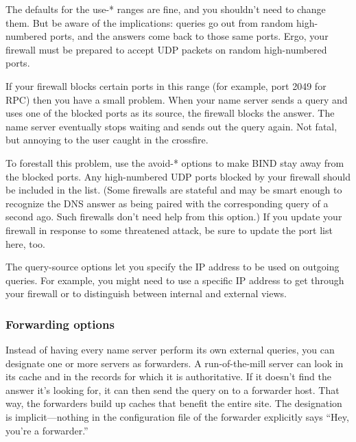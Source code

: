 The defaults for the {use-*} ranges are fine, and you shouldn't need to
change them. But be aware of the implications: queries go out from
random high-numbered ports, and the answers come back to those same
ports. Ergo, your firewall must be prepared to accept UDP packets on
random high-numbered ports.

If your firewall blocks certain ports in this range (for example, port
2049 for RPC) then you have a small problem. When your name server sends
a query and uses one of the blocked ports as its source, the firewall
blocks the answer. The name server eventually stops waiting and sends
out the query again. Not fatal, but annoying to the user caught in the
crossfire.

To forestall this problem, use the {avoid-*} options to make BIND stay
away from the blocked ports. Any high-numbered UDP ports blocked by your
firewall should be included in the list. (Some firewalls are stateful
and may be smart enough to recognize the DNS answer as being paired with
the corresponding query of a second ago. Such firewalls don't need help
from this option.) If you update your firewall in response to some
threatened attack, be sure to update the port list here, too.

The {query-source} options let you specify the IP address to be used on
outgoing queries. For example, you might need to use a specific IP
address to get through your firewall or to distinguish between internal
and external views.

\subsubsection[Forwarding options]{\texorpdfstring{Forwarding
options\protect\hypertarget{part0024_split_037.htmlux5cux23_idIndexMarker2145}{}{}\protect\hypertarget{part0024_split_037.htmlux5cux23_idTextAnchor900}{}{}\protect\hypertarget{part0024_split_037.htmlux5cux23_idIndexMarker2146}{}{}}{Forwarding options}}


Instead of having every name server perform its own external queries,
you can designate one or more servers as forwarders. A run-of-the-mill
server can look in its cache and in the records for which it is
authoritative. If it doesn't find the answer it's looking for, it can
then send the query on to a forwarder host. That way, the forwarders
build up caches that benefit the entire site. The designation is
implicit---nothing in the configuration file of the forwarder explicitly
says ``Hey, you're a forwarder.''

